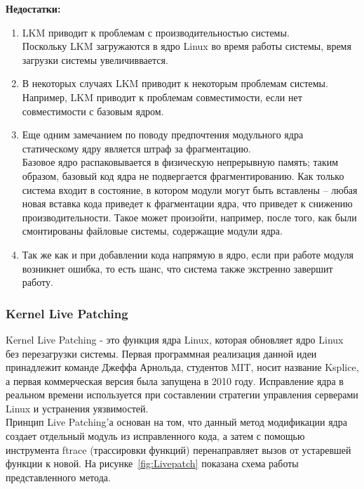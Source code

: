 \textbf{Недостатки:}
\begin{enumerate}
    \item LKM приводит к проблемам с производительностью системы. \vspace{1mm}\\
    Поскольку LKM загружаются в ядро Linux во время работы системы, время загрузки системы увеличиввается.
    \item В некоторых случаях LKM приводит к некоторым проблемам системы.\vspace{1mm}\\
    Например, LKM приводит к проблемам совместимости, если нет совместимости с базовым ядром.
    \item Еще одним замечанием по поводу предпочтения модульного ядра статическому ядру является штраф за фрагментацию. \vspace{1mm}\\
    Базовое ядро распаковывается в физическую непрерывную память;
    таким образом, базовый код ядра не подвергается фрагментированию.
    Как только система входит в состояние, в котором модули могут быть вставлены -- любая новая вставка кода приведет к фрагментации ядра, 
    что приведет к снижению производительности.
    Такое может произойти, например, после того, как были смонтированы файловые системы, содержащие модули ядра.
    \item Так же как и при добавлении кода напрямую в ядро, если при работе модуля возникнет ошибка, то есть шанс, что система также экстренно завершит работу.
\end{enumerate}

\subsubsection{Kernel Live Patching}\label{subsec:kernel-live-patching}

Kernel Live Patching - это функция ядра Linux, которая обновляет ядро Linux без перезагрузки системы.
Первая программная реализация данной идеи принадлежит команде Джеффа Арнольда, студентов MIT, носит название Ksplice\cite{ksplice}, а первая коммерческая версия была запущена в 2010 году.
Исправление ядра в реальном времени используется при составлении стратегии управления серверами Linux и устранения уязвимостей.
\\
Принцип Live Patching’а основан на том, что данный метод модификации ядра создает отдельный модуль из исправленного кода, а затем с помощью инструмента ftrace (трассировки функций) перенаправляет вызов от устаревшей функции к новой.
На рисунке~\ref{fig:Livepatch} показана схема работы представленного метода.

